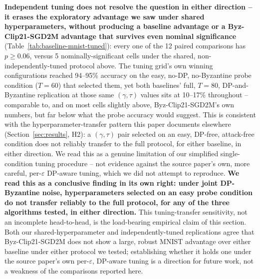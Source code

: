 \documentclass{article}
\begin{document}
\textbf{Independent tuning does not resolve the question in either
direction -- it erases the exploratory advantage we saw under shared
hyperparameters, without producing a baseline advantage or a
Byz-Clip21-SGD2M advantage that survives even nominal significance}
(Table~\ref{tab:baseline-mnist-tuned}): every one of the 12 paired comparisons
has $p\geq0.06$, versus 5 nominally-significant cells under the shared,
non-independently-tuned protocol above. The tuning grid's own winning
configurations reached 94--95\% accuracy on the easy, no-DP, no-Byzantine
probe condition ($T{=}60$) that selected them, yet both baselines' full,
$T{=}80$, DP-and-Byzantine replication at those same $(\gamma,\tau)$ values
sits at 10--17\% throughout -- comparable to, and on most cells slightly
above, Byz-Clip21-SGD2M's own numbers, but far below what the probe accuracy
would suggest. This is consistent with the hyperparameter-transfer pattern
this paper documents elsewhere (Section~\ref{sec:results}, H2): a
$(\gamma,\tau)$ pair selected on an easy, DP-free, attack-free condition does
not reliably transfer to the full protocol, for either baseline, in either
direction. We read this as a genuine limitation of our simplified
single-condition tuning procedure -- not evidence against the source paper's
own, more careful, per-$\varepsilon$ DP-aware tuning, which we did not
attempt to reproduce. \textbf{We read this as a conclusive finding in its own
right: under joint DP-Byzantine noise, hyperparameters selected on an
easy probe condition do not transfer reliably to the full protocol, for any
of the three algorithms tested, in either direction.} This tuning-transfer
sensitivity, not an incomplete head-to-head, is the load-bearing empirical
claim of this section. Both our shared-hyperparameter and
independently-tuned replications agree that Byz-Clip21-SGD2M does not show a
large, robust MNIST advantage over either baseline under either protocol we
tested; establishing whether it holds one under the source paper's own
per-$\varepsilon$, DP-aware tuning is a direction for future work, not a
weakness of the comparisons reported here.
\end{document}

